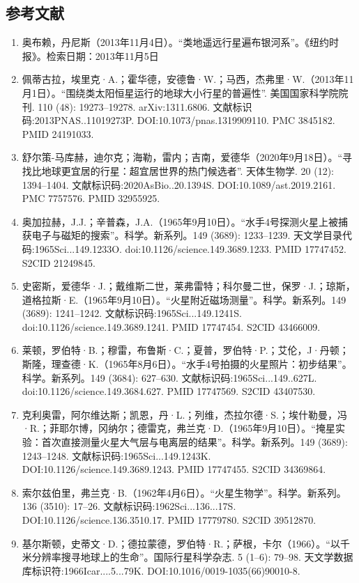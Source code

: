 \subsection{参考文献}
\begin{enumerate}
\item 奥布赖，丹尼斯（2013年11月4日）。“类地遥远行星遍布银河系”。《纽约时报》。检索日期：2013年11月5日
\item 佩蒂古拉，埃里克·A.；霍华德，安德鲁·W.；马西，杰弗里·W.（2013年11月1日）。“围绕类太阳恒星运行的地球大小行星的普遍性”. 美国国家科学院院刊. 110 (48): 19273–19278. arXiv:1311.6806. 文献标识码:2013PNAS..11019273P. DOI:10.1073/pnas.1319909110. PMC 3845182. PMID 24191033.
\item 舒尔策-马库赫，迪尔克；海勒，雷内；吉南，爱德华（2020年9月18日）。“寻找比地球更宜居的行星：超宜居世界的热门候选者”. 天体生物学. 20 (12): 1394–1404. 文献标识码:2020AsBio..20.1394S. DOI:10.1089/ast.2019.2161. PMC 7757576. PMID 32955925.
\item 奥加拉赫，J.J.；辛普森，J.A.（1965年9月10日）。“水手4号探测火星上被捕获电子与磁矩的搜索”。科学。新系列。149 (3689): 1233–1239. 天文学目录代码:1965Sci...149.1233O. doi:10.1126/science.149.3689.1233. PMID 17747452. S2CID 21249845.
\item 史密斯，爱德华·J.；戴维斯二世，莱弗雷特；科尔曼二世，保罗·J.；琼斯，道格拉斯·E.（1965年9月10日）。“火星附近磁场测量”。科学。新系列。149 (3689): 1241–1242. 文献标识码:1965Sci...149.1241S. doi:10.1126/science.149.3689.1241. PMID 17747454. S2CID 43466009.
\item 莱顿，罗伯特·B.；穆雷，布鲁斯·C.；夏普，罗伯特·P.；艾伦，J·丹顿；斯隆，理查德·K.（1965年8月6日）。“水手4号拍摄的火星照片：初步结果”。科学。新系列。149 (3684): 627–630. 文献标识码:1965Sci...149..627L. doi:10.1126/science.149.3684.627. PMID 17747569. S2CID 43407530.
\item 克利奥雷，阿尔维达斯；凯恩，丹·L.；列维，杰拉尔德·S.；埃什勒曼，冯·R.；菲耶尔博，冈纳尔；德雷克，弗兰克·D.（1965年9月10日）。“掩星实验：首次直接测量火星大气层与电离层的结果”。科学。新系列。149 (3689): 1243–1248. 文献标识码:1965Sci...149.1243K. DOI:10.1126/science.149.3689.1243. PMID 17747455. S2CID 34369864.
\item 索尔兹伯里，弗兰克·B.（1962年4月6日）。“火星生物学”。科学。新系列。136 (3510): 17–26. 文献标识码:1962Sci...136...17S. DOI:10.1126/science.136.3510.17. PMID 17779780. S2CID 39512870.
\item 基尔斯顿，史蒂文·D.；德拉蒙德，罗伯特·R.；萨根，卡尔（1966）。“以千米分辨率搜寻地球上的生命”。国际行星科学杂志. 5 (1–6): 79–98. 天文学数据库标识符:1966Icar....5...79K. DOI:10.1016/0019-1035(66)90010-8.

\end{enumerate}

